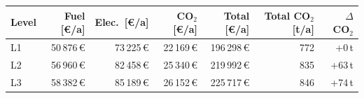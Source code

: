 \begin{tabular}{lrrrrrr}
\toprule
Level & Fuel [\euro/a] & Elec.\ [\euro/a] & CO$_2$ [\euro/a] & Total [\euro/a] & Total CO$_2$ [t/a] & $\Delta$~CO$_2$ \\
\midrule
L1 & 50\,876\,\euro{} & 73\,225\,\euro{} & 22\,169\,\euro{} & 196\,298\,\euro{} & 772 & +0\,t \\
L2 & 56\,960\,\euro{} & 82\,458\,\euro{} & 25\,340\,\euro{} & 219\,992\,\euro{} & 835 & +63\,t \\
L3 & 58\,382\,\euro{} & 85\,189\,\euro{} & 26\,152\,\euro{} & 225\,717\,\euro{} & 846 & +74\,t \\
\bottomrule
\end{tabular}
